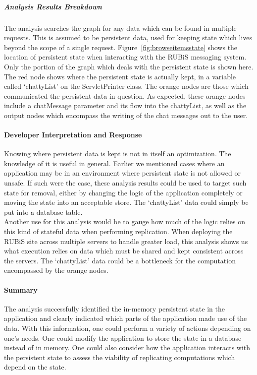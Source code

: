 \documentclass[msc,oneside]{ubcthesis}
\begin{document}
\subparagraph{Analysis Results Breakdown}
The analysis searches the graph for any data which can be found in multiple requests. This is assumed to be persistent data, used for keeping state which lives beyond the scope of a single request. Figure~\ref{fig:browseitemsstate} shows the location of persistent state when interacting with the RUBiS messaging system. Only the portion of the graph which deals with the persistent state is shown here. The red node shows where the persistent state is actually kept, in a variable called `chattyList' on the ServletPrinter class. The orange nodes are those which communicated the persistent data in question. As expected, these  orange nodes include a chatMessage parameter and its flow into the chattyList, as well as the output nodes which encompass the writing of the chat messages out to the user.\\

\paragraph{Developer Interpretation and Response}
Knowing where persistent data is kept is not in itself an optimization. The knowledge of it is useful in general. Earlier we mentioned cases where an application may be in an environment where persistent state is not allowed or unsafe. If such were the case, these analysis results could be used to target such state for removal, either by changing the logic of the application completely or moving the state into an acceptable store. The `chattyList' data could simply be put into a database table.\\

Another use for this analysis would be to gauge how much of the logic relies on this kind of stateful data when performing replication. When deploying the RUBiS site across multiple servers to handle greater load, this analysis shows us what execution relies on data which must be shared and kept consistent across the servers. The `chattyList' data could be a bottleneck for the computation encompassed by the orange nodes.

\paragraph{Summary}
The analysis successfully identified the in-memory persistent state in the application and clearly indicated which parts of the application made use of the data. With this information, one could perform a variety of actions depending on one's needs. One could modify the application to store the state in a database instead of in memory. One could also consider how the application interacts with the persistent state to assess the viability of replicating computations which depend on the state.
\end{document}
